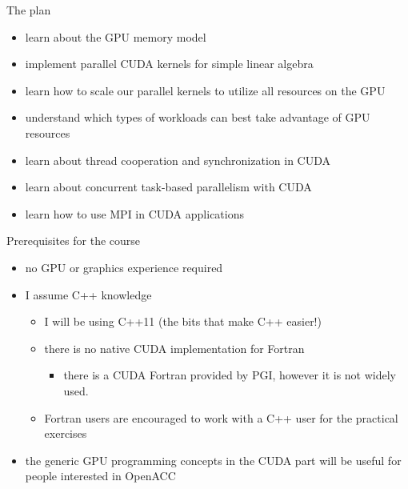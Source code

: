 
\begin{frame}[fragile]{}
    \begin{info}{The plan}
        \begin{itemize}
            \item learn about the GPU memory model
            \item implement parallel CUDA kernels for simple linear algebra
            \item learn how to scale our parallel kernels to utilize all resources on the GPU
            \item understand which types of workloads can best take advantage of GPU resources
            \item learn about thread cooperation and synchronization in CUDA
            \item learn about concurrent task-based parallelism with CUDA
            \item learn how to use MPI in CUDA applications
        \end{itemize}
    \end{info}

\end{frame}

\begin{frame}[fragile]{}
    \begin{info}{Prerequisites for the course}
        \begin{itemize}
            \item no GPU or graphics experience required
            \item I assume C++ knowledge
            \begin{itemize}
                \item I will be using C++11 (the bits that make C++ easier!)
                \item there is no native CUDA implementation for Fortran
                \begin{itemize}
                    \item there is a CUDA Fortran provided by PGI, however it is not widely used.
                \end{itemize}
                \item Fortran users are encouraged to work with a C++ user for the practical exercises
            \end{itemize}
            \item the generic GPU programming concepts in the CUDA part will be useful for people interested in OpenACC
        \end{itemize}
    \end{info}

\end{frame}


